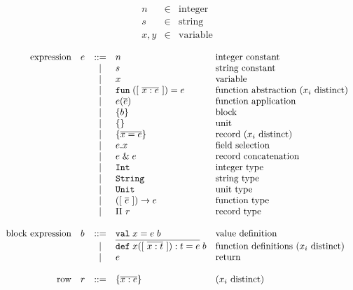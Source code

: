 \documentclass[11pt]{article}
\begin{document}
\[
\begin{array}{lcl}
n & \in & \text{integer} \\
s & \in & \text{string} \\
x, y & \in & \text{variable} \\
\end{array}
\]
\[
\begin{array}{rlcll}
\text{expression}
  & e & ::= & n                      & \text{integer constant} \\
  &   & |   & s                      & \text{string constant} \\
  &   & |   & x                      & \text{variable} \\
  &   & |   & \mathtt{fun}\;([\ \overline{x : e}\ ]) = e  & \text{function abstraction ($x_i$ distinct)} \\
  &   & |   & e(\overline{e})            & \text{function application} \\
  &   & |   & \{ b \}                      & \text{block} \\
  &   & |   & \{ \}{}                       & \text{unit} \\
  &   & |   & \{ \overline{x = e} \}                   & \text{record ($x_i$ distinct)} \\
  &   & |   & e . x                   & \text{field selection} \\
  &   & |   & e\;\&\;e                   & \text{record concatenation} \\
  &   & |   & \mathtt{Int}                        & \text{integer type} \\
  &   & |   & \mathtt{String}                        & \text{string type} \\
  &   & |   & \mathtt{Unit}                        & \text{unit type} \\
  &   & |   & ([\ \overline{e}\ ]) -> e           & \text{function type} \\
  &   & |   & \Pi\ r                     & \text{record type} \\
\\
\text{block expression}
  & b & ::= & \mathtt{val}\;x = e\;b                 & \text{value definition} \\
  &   & |   & \overline{\mathtt{def}\;x([\ \overline{x : t}\ ]) : t = e}\;b   & \text{function definitions ($x_i$ distinct)} \\
  &   & |   & e                       & \text{return} \\
\\
\text{row}
  & r & ::= & \{ \overline{x : e} \}       & \text{($x_i$ distinct)}
\end{array}
\]
\end{document}
